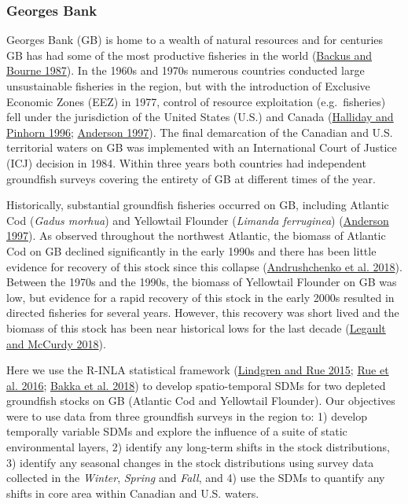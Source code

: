 \documentclass[
]{article}
\begin{document}
\hypertarget{georges-bank}{%
\subsubsection{Georges Bank}\label{georges-bank}}

Georges Bank (GB) is home to a wealth of natural resources and for centuries GB has had some of the most productive fisheries in the world (\protect\hyperlink{ref-backusGeorgesBank1987}{Backus and Bourne 1987}). In the 1960s and 1970s numerous countries conducted large unsustainable fisheries in the region, but with the introduction of Exclusive Economic Zones (EEZ) in 1977, control of resource exploitation (e.g.~fisheries) fell under the jurisdiction of the United States (U.S.) and Canada (\protect\hyperlink{ref-hallidayNorthAtlanticFishery1996}{Halliday and Pinhorn 1996}; \protect\hyperlink{ref-andersonHistoryFisheriesManagement1997}{Anderson 1997}). The final demarcation of the Canadian and U.S. territorial waters on GB was implemented with an International Court of Justice (ICJ) decision in 1984. Within three years both countries had independent groundfish surveys covering the entirety of GB at different times of the year.

Historically, substantial groundfish fisheries occurred on GB, including Atlantic Cod (\emph{Gadus morhua}) and Yellowtail Flounder (\emph{Limanda ferruginea}) (\protect\hyperlink{ref-andersonHistoryFisheriesManagement1997}{Anderson 1997}). As observed throughout the northwest Atlantic, the biomass of Atlantic Cod on GB declined significantly in the early 1990s and there has been little evidence for recovery of this stock since this collapse (\protect\hyperlink{ref-andrushchenkoAssessmentEasternGeorges2018}{Andrushchenko et al. 2018}). Between the 1970s and the 1990s, the biomass of Yellowtail Flounder on GB was low, but evidence for a rapid recovery of this stock in the early 2000s resulted in directed fisheries for several years. However, this recovery was short lived and the biomass of this stock has been near historical lows for the last decade (\protect\hyperlink{ref-legaultStockAssessmentGeorges2018}{Legault and McCurdy 2018}).

Here we use the R-INLA statistical framework (\protect\hyperlink{ref-lindgrenBayesianSpatialModelling2015}{Lindgren and Rue 2015}; \protect\hyperlink{ref-rueBayesianComputingINLA2016}{Rue et al. 2016}; \protect\hyperlink{ref-bakkaSpatialModellingRINLA2018}{Bakka et al. 2018}) to develop spatio-temporal SDMs for two depleted groundfish stocks on GB (Atlantic Cod and Yellowtail Flounder). Our objectives were to use data from three groundfish surveys in the region to: 1) develop temporally variable SDMs and explore the influence of a suite of static environmental layers, 2) identify any long-term shifts in the stock distributions, 3) identify any seasonal changes in the stock distributions using survey data collected in the \emph{Winter}, \emph{Spring} and \emph{Fall}, and 4) use the SDMs to quantify any shifts in core area within Canadian and U.S. waters.
\end{document}

